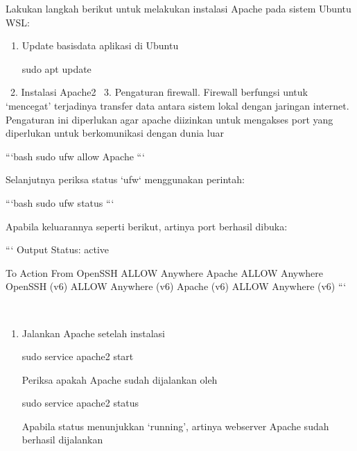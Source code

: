 \documentclass[letterpaper,10pt,english]{sphinxmanual}
\begin{document}
Lakukan langkah berikut untuk melakukan instalasi Apache pada sistem Ubuntu WSL:
\begin{enumerate}
%
\item {} 
Update basisdata aplikasi di Ubuntu

\begin{sphinxVerbatim}[commandchars=\\\{\}]
 sudo apt update
\end{sphinxVerbatim}

\end{enumerate}

 2. Instalasi Apache2
 3. Pengaturan firewall. Firewall berfungsi untuk ‘mencegat’ terjadinya  transfer data antara sistem lokal dengan jaringan internet. Pengaturan ini diperlukan agar apache diizinkan untuk mengakses port yang diperlukan untuk berkomunikasi dengan dunia luar

\begin{sphinxVerbatim}[commandchars=\\\{\}]
```bash
sudo ufw allow \PYGZsq{}Apache\PYGZsq{}
```

Selanjutnya periksa status `ufw` menggunakan perintah:

```bash
sudo ufw status
```

Apabila keluarannya seperti berikut, artinya port berhasil dibuka:

```
Output
Status: active

To                         Action      From
\PYGZhy{}\PYGZhy{}                         \PYGZhy{}\PYGZhy{}\PYGZhy{}\PYGZhy{}\PYGZhy{}\PYGZhy{}      \PYGZhy{}\PYGZhy{}\PYGZhy{}\PYGZhy{}
OpenSSH                    ALLOW       Anywhere                  
Apache                     ALLOW       Anywhere                  
OpenSSH (v6)               ALLOW       Anywhere (v6)             
Apache (v6)                ALLOW       Anywhere (v6)
```
\end{sphinxVerbatim}

 
\begin{enumerate}
%
\item {} 
Jalankan Apache setelah instalasi

\begin{sphinxVerbatim}[commandchars=\\\{\}]
sudo service apache2 start
\end{sphinxVerbatim}

Periksa apakah Apache sudah dijalankan oleh 

\begin{sphinxVerbatim}[commandchars=\\\{\}]
sudo service apache2 status
\end{sphinxVerbatim}

Apabila status menunjukkan ‘running’, artinya webserver Apache sudah berhasil dijalankan

\end{enumerate}
\end{document}
